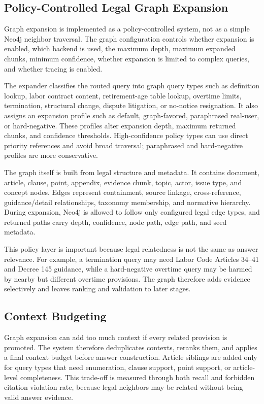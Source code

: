 
\subsection{Policy-Controlled Legal Graph Expansion}
Graph expansion is implemented as a policy-controlled system, not as a simple Neo4j neighbor traversal. The graph configuration controls whether expansion is enabled, which backend is used, the maximum depth, maximum expanded chunks, minimum confidence, whether expansion is limited to complex queries, and whether tracing is enabled.

The expander classifies the routed query into graph query types such as definition lookup, labor contract content, retirement-age table lookup, overtime limits, termination, structural change, dispute litigation, or no-notice resignation. It also assigns an expansion profile such as default, graph-favored, paraphrased real-user, or hard-negative. These profiles alter expansion depth, maximum returned chunks, and confidence thresholds. High-confidence policy types can use direct priority references and avoid broad traversal; paraphrased and hard-negative profiles are more conservative.

The graph itself is built from legal structure and metadata. It contains document, article, clause, point, appendix, evidence chunk, topic, actor, issue type, and concept nodes. Edges represent containment, source linkage, cross-reference, guidance/detail relationships, taxonomy membership, and normative hierarchy. During expansion, Neo4j is allowed to follow only configured legal edge types, and returned paths carry depth, confidence, node path, edge path, and seed metadata.

This policy layer is important because legal relatedness is not the same as answer relevance. For example, a termination query may need Labor Code Articles 34--41 and Decree 145 guidance, while a hard-negative overtime query may be harmed by nearby but different overtime provisions. The graph therefore adds evidence selectively and leaves ranking and validation to later stages.

\subsection{Context Budgeting}
Graph expansion can add too much context if every related provision is promoted. The system therefore deduplicates contexts, reranks them, and applies a final context budget before answer construction. Article siblings are added only for query types that need enumeration, clause support, point support, or article-level completeness. This trade-off is measured through both recall and forbidden citation violation rate, because legal neighbors may be related without being valid answer evidence.

